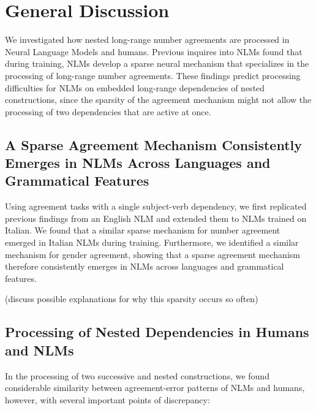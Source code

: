 \section{General Discussion}
We investigated how nested long-range number agreements are processed in Neural Language Models and humans. Previous inquires into NLMs found that during training, NLMs develop a sparse neural mechanism that specializes in the processing of long-range number agreements. These findings predict processing difficulties for NLMs on embedded long-range dependencies of nested constructions, since the sparsity of the agreement mechanism might not allow the processing of two dependencies that are active at once.

\subsection{A Sparse Agreement Mechanism Consistently Emerges in NLMs Across Languages and Grammatical Features}
Using agreement tasks with a single subject-verb dependency, we first replicated previous findings from an English NLM and extended them to NLMs trained on Italian. We found that a similar sparse mechanism for number agreement emerged in Italian NLMs during training. Furthermore, we identified a similar mechanism for gender agreement, showing that a sparse agreement mechanism therefore consistently emerges in NLMs across languages and grammatical features. 

(discuss possible explanations for why this sparsity occurs so often)

\subsection{Processing of Nested Dependencies in Humans and NLMs}
In the processing of two successive and nested constructions, we found considerable similarity between agreement-error patterns of NLMs and humans, however, with several important points of discrepancy:
